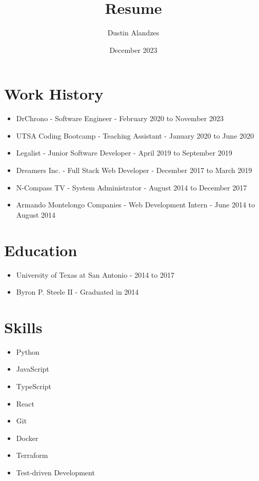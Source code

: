 \documentclass{article}
\title{Resume}
\author{Dustin Alandzes}
\date{December 2023}
\begin{document}
   \maketitle
   \section{Work History}
   \begin{itemize}
      \item DrChrono - Software Engineer - February 2020 to November 2023
      \item UTSA Coding Bootcamp - Teaching Assistant - January 2020 to June 2020
      \item Legalist - Junior Software Developer - April 2019 to September 2019
      \item Dreamers Inc. - Full Stack Web Developer - December 2017 to March 2019
      \item N-Compass TV - System Administrator - August 2014 to December 2017
      \item Armando Montelongo Companies - Web Development Intern - June 2014 to August 2014
   \end{itemize}

   \section{Education}
   \begin{itemize}
      \item University of Texas at San Antonio - 2014 to 2017
      \item Byron P. Steele II - Graduated in 2014
   \end{itemize}

   \section{Skills}
   \begin{itemize}
      \item Python
      \item JavaScript
      \item TypeScript
      \item React
      \item Git
      \item Docker
      \item Terraform
      \item Test-driven Development
   \end{itemize}
\end{document}
